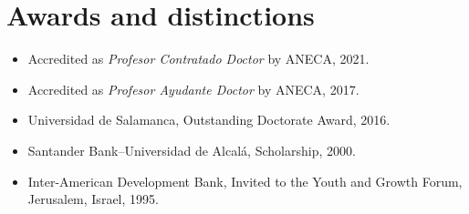 \documentclass[11pt]{article}\usepackage[]{graphicx}\usepackage[usenames,dvipsnames]{xcolor}
\begin{document}
\section{Awards and distinctions} 
\begin{itemize}
  \item Accredited as \emph{Profesor Contratado Doctor} by ANECA, 2021.
  \item Accredited as \emph{Profesor Ayudante Doctor} by ANECA, 2017.
  \item Universidad de Salamanca, Outstanding Doctorate Award, 2016.
  \item Santander Bank--Universidad de Alcalá, Scholarship, 2000.
  \item Inter-American Development Bank, Invited to the Youth and Growth Forum, Jerusalem, Israel, 1995.
\end{itemize}
\end{document}

